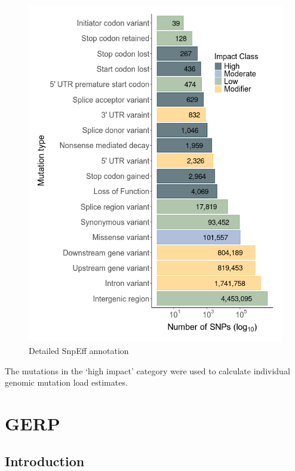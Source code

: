 \documentclass[
  letterpaper,
  DIV=11,
  numbers=noendperiod]{scrreprt}
\begin{document}
\begin{figure}

{\centering \includegraphics{qmd/../plots/main/fig_1c.png}

}

\caption{Detailed SnpEff annotation}

\end{figure}

The mutations in the `high impact' category were used to calculate
individual genomic mutation load estimates.


\hypertarget{gerp}{%
\chapter{GERP}\label{gerp}}

\hypertarget{introduction-2}{%
\section{Introduction}\label{introduction-2}}
\end{document}
